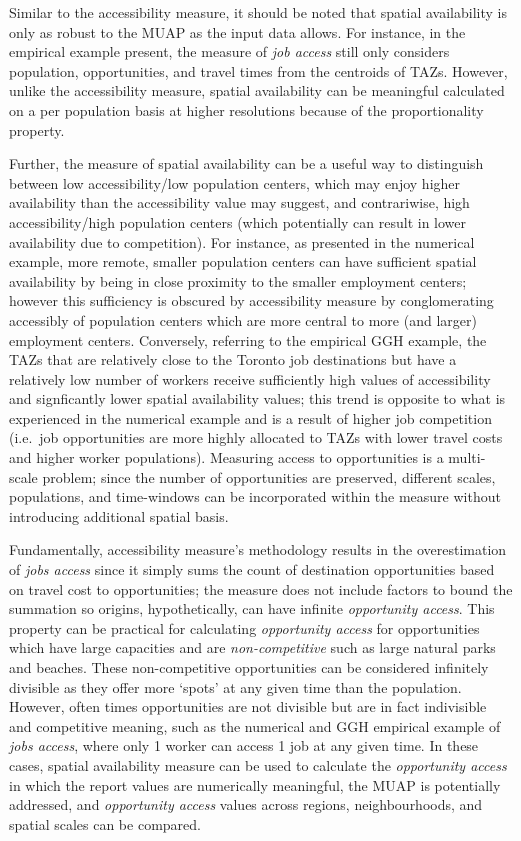 \documentclass[]{elsarticle} %
\begin{document}
Similar to the accessibility measure, it should be noted that spatial
availability is only as robust to the MUAP as the input data allows. For
instance, in the empirical example present, the measure of \emph{job
access} still only considers population, opportunities, and travel times
from the centroids of TAZs. However, unlike the accessibility measure,
spatial availability can be meaningful calculated on a per population
basis at higher resolutions because of the proportionality property.

Further, the measure of spatial availability can be a useful way to
distinguish between low accessibility/low population centers, which may
enjoy higher availability than the accessibility value may suggest, and
contrariwise, high accessibility/high population centers (which
potentially can result in lower availability due to competition). For
instance, as presented in the numerical example, more remote, smaller
population centers can have sufficient spatial availability by being in
close proximity to the smaller employment centers; however this
sufficiency is obscured by accessibility measure by conglomerating
accessibly of population centers which are more central to more (and
larger) employment centers. Conversely, referring to the empirical GGH
example, the TAZs that are relatively close to the Toronto job
destinations but have a relatively low number of workers receive
sufficiently high values of accessibility and signficantly lower spatial
availability values; this trend is opposite to what is experienced in
the numerical example and is a result of higher job competition
(i.e.~job opportunities are more highly allocated to TAZs with lower
travel costs and higher worker populations). Measuring access to
opportunities is a multi-scale problem; since the number of
opportunities are preserved, different scales, populations, and
time-windows can be incorporated within the measure without introducing
additional spatial basis.

Fundamentally, accessibility measure's methodology results in the
overestimation of \emph{jobs access} since it simply sums the count of
destination opportunities based on travel cost to opportunities; the
measure does not include factors to bound the summation so origins,
hypothetically, can have infinite \emph{opportunity access}. This
property can be practical for calculating \emph{opportunity access} for
opportunities which have large capacities and are \emph{non-competitive}
such as large natural parks and beaches. These non-competitive
opportunities can be considered infinitely divisible as they offer more
`spots' at any given time than the population. However, often times
opportunities are not divisible but are in fact indivisible and
competitive meaning, such as the numerical and GGH empirical example of
\emph{jobs access}, where only 1 worker can access 1 job at any given
time. In these cases, spatial availability measure can be used to
calculate the \emph{opportunity access} in which the report values are
numerically meaningful, the MUAP is potentially addressed, and
\emph{opportunity access} values across regions, neighbourhoods, and
spatial scales can be compared.
\end{document}
